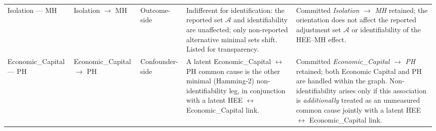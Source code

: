 \begin{longtable}{@{}p{1.9cm}p{1.9cm}p{1.4cm}p{2.7cm}p{4.9cm}@{}}
\addlinespace
Isolation --- MH & Isolation $\to$ MH & Outcome-side & Indifferent for identification: the reported set $\mathcal{A}$ and identifiability are unaffected; only non-reported alternative minimal sets shift. Listed for transparency. & Committed \textit{Isolation $\to$ MH} retained; the orientation does not affect the reported adjustment set $\mathcal{A}$ or identifiability of the HEE--MH effect. \\
\addlinespace
Economic\_Capital --- PH & Economic\_Capital $\to$ PH & Confounder-side & A latent Economic\_Capital $\leftrightarrow$ PH common cause is the other minimal (Hamming-2) non-identifiability leg, in conjunction with a latent HEE $\leftrightarrow$ Economic\_Capital link. & Committed \textit{Economic\_Capital $\to$ PH} retained; both Economic Capital and PH are handled within the graph. Non-identifiability arises only if this association is \emph{additionally} treated as an unmeasured common cause jointly with a latent HEE $\leftrightarrow$ Economic\_Capital link. \\
\end{longtable}
